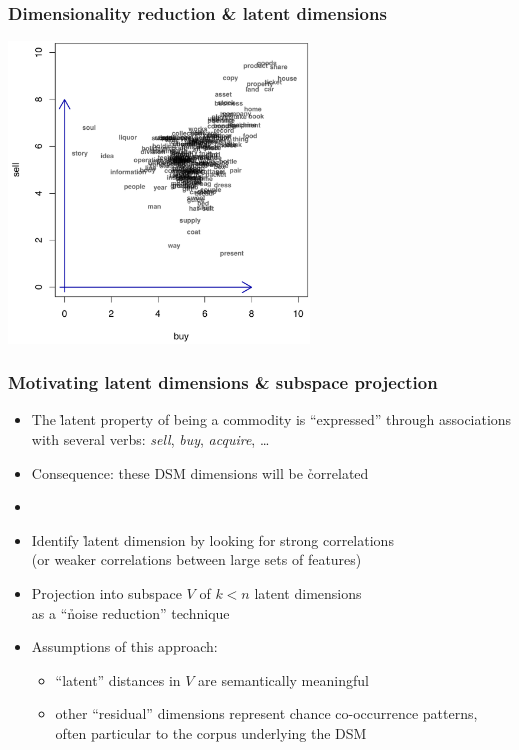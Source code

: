 \documentclass[t]{beamer} %
\begin{document}
\begin{frame}[c]
  \frametitle{Dimensionality reduction \& latent dimensions}
  \begin{center}
    \ungap[1]
    \includegraphics[width=8cm]{img/buy_sell_labels_only}
  \end{center}
\end{frame}

\begin{frame}
  \frametitle{Motivating latent dimensions \& subspace projection}

  \begin{itemize}
  \item The \h{latent property} of being a commodity is ``expressed''
    through associations with several verbs: \emph{sell}, \emph{buy},
    \emph{acquire}, \ldots
  \item Consequence: these DSM dimensions will be \h{correlated}
  \item[]\pause
  \item Identify \h{latent dimension} by looking for strong correlations\\
    (or weaker correlations between large sets of features)%
  \item Projection into subspace $V$ of $k < n$ latent dimensions\\
    as a ``\h{noise reduction}'' technique \so {}
  \item Assumptions of this approach:
    \begin{itemize}
    \item ``latent'' distances in $V$ are semantically meaningful
    \item other ``residual'' dimensions represent chance co-occurrence
      patterns, often particular to the corpus underlying the DSM
    \end{itemize}
  \end{itemize}
\end{frame}
\end{document}
